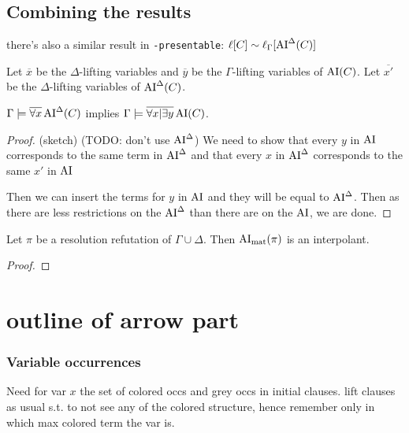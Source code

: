 \documentclass[,%
	draft=false,%
	numbers=noendperiod
	11pt,
	a4paper,
	oneside,%
	openany,
]{memoir}
\begin{document}
\section{Combining the results}


there's also a similar result in \texttt{-presentable}: $\ell[C] \sim \ell_{\Gamma}[ \operatorname{AI}^\Delta(C) ] $

\begin{lemma}
	Let $\overline x$ be the $\Delta$-lifting variables and $\overline y$ be the $\Gamma$-lifting variables of $\operatorname{AI}(C)$.
	Let $\overline {x'}$ be the $\Delta$-lifting variables of $\operatorname{AI}^\Delta(C)$.

	$\Gamma \models \overline{\forall x} \operatorname{AI}^\Delta(C)$ implies
	$\Gamma \models \overline{\forall x | \exists y} \operatorname{AI}(C)$.
\end{lemma}
\begin{proof}
	\cbstart
	(sketch) (TODO: don't use $\operatorname{AI}^\Delta$)
	We need to show that every $y$ in $\operatorname{AI}$ corresponds to the same term in $\operatorname{AI}^\Delta$ and that every $x$ in $\operatorname{AI}^\Delta$ corresponds to the same $x'$ in $\operatorname{AI}$

	Then we can insert the terms for $y$ in $\operatorname{AI}$ and they will be equal to $\operatorname{AI}^\Delta$. Then as there are less restrictions on the $\operatorname{AI}^\Delta$ than there are on the $\operatorname{AI}$, we are done.
	\cbend
\end{proof}


\begin{thm}
	Let $\pi$ be a resolution refutation of $\Gamma\cup\Delta$.
	Then $\operatorname{AI}_\mathrm{mat}( \pi )$ is an interpolant.
\end{thm}
\begin{proof}

\end{proof}

\label{sec:arrow_quantifier_block}

\chapter{outline of arrow part}


\subsection{Variable occurrences}
Need for var $x$ the set of colored occs and grey occs in initial clauses.
lift clauses as usual s.t. to not see any of the colored structure, hence remember only in which max colored term the var is.
\end{document}
